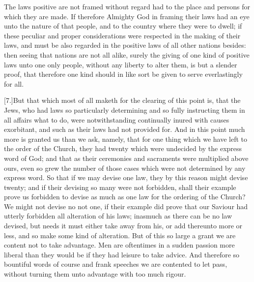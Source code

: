 The laws positive are not framed without regard had to the place and persons for which they are made. If therefore Almighty God in framing their laws had an eye unto the nature of that people, and to the country where they were to dwell; if these peculiar and proper considerations were respected in the making of their laws, and must be also regarded in the positive laws of all other nations besides: then seeing that nations are not all alike, surely the giving of one kind of positive laws unto one only people, without any liberty to  alter them, is but a slender proof, that therefore one kind should in like sort be given to serve everlastingly for all.

[7.]But that which most of all maketh for the clearing of this point is, that the Jews, who had laws so particularly determining and so fully instructing them in all affairs what to do, were notwithstanding continually inured with causes exorbitant, and such as their laws had not provided for. And in this point much more is granted us than we ask, namely, that for one thing which we have left to the order of the Church, they had twenty which were undecided by the express word of God; and that as their ceremonies and sacraments were multiplied above ours, even so grew the number of those cases which were not determined by any express word. So that if we may devise one law, they by this reason might devise twenty; and if their devising so many were not forbidden, shall their example prove us forbidden to devise as much as one law for the ordering of the Church? We might not devise no not one, if their example did prove that our Saviour had utterly forbidden all alteration of his laws; inasmuch as there can be no law devised, but needs it must either take away from his, or add thereunto more or less, and so make some kind of alteration. But of this so large a grant we are content not to take advantage. Men are oftentimes in a sudden passion more liberal than they would be if they had leisure to take advice. And therefore so bountiful words of course and frank speeches we are contented to let pass, without turning them unto advantage with too much rigour.

